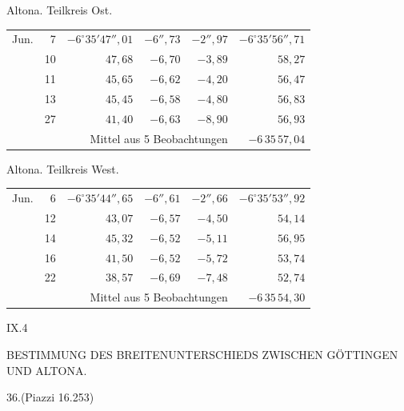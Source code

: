 \noindent\begin{minipage}[t]{.495\textwidth}\centering Altona. Teilkreis Ost.\par\smallskip
{\scriptsize\setlength{\tabcolsep}{1pt}\renewcommand{\arraystretch}{1.2}\begin{tabular}{lr|r|r|r|r|}
Jun.&7&$-6^\circ35'47''{,}01$&$-6''{,}73$&$-2''{,}97$&$-6^\circ35'56''{,}71$\\
&10&$47{,}68$&$-6{,}70$&$-3{,}89$&$58{,}27$\\
&11&$45{,}65$&$-6{,}62$&$-4{,}20$&$56{,}47$\\
&13&$45{,}45$&$-6{,}58$&$-4{,}80$&$56{,}83$\\
&27&$41{,}40$&$-6{,}63$&$-8{,}90$&$56{,}93$\\
\cline{6-6}\multicolumn{5}{r}{Mittel aus 5 Beobachtungen}&$-6\,35\,57{,}04$
\end{tabular}}\end{minipage}\hfill\begin{minipage}[t]{.495\textwidth}\centering Altona. Teilkreis West.\par\smallskip
{\scriptsize\setlength{\tabcolsep}{1pt}\renewcommand{\arraystretch}{1.2}\begin{tabular}{lr|r|r|r|r}
Jun.&6&$-6^\circ35'44''{,}65$&$-6''{,}61$&$-2''{,}66$&$-6^\circ35'53''{,}92$\\
&12&$43{,}07$&$-6{,}57$&$-4{,}50$&$54{,}14$\\
&14&$45{,}32$&$-6{,}52$&$-5{,}11$&$56{,}95$\\
&16&$41{,}50$&$-6{,}52$&$-5{,}72$&$53{,}74$\\
&22&$38{,}57$&$-6{,}69$&$-7{,}48$&$52{,}74$\\
\cline{6-6}\multicolumn{5}{r}{Mittel aus 5 Beobachtungen}&$-6\,35\,54{,}30$
\end{tabular}}\end{minipage}
\par\vspace{4mm}
\noindent IX.\hfill 4\par

\clearpage
\noindent{}\parbox[t]{\dimexpr\textwidth-10mm\relax}{\centering\scriptsize BESTIMMUNG DES BREITENUNTERSCHIEDS ZWISCHEN GÖTTINGEN UND ALTONA.}\par
\begin{center}36.\quad (Piazzi 16.253)\end{center}

